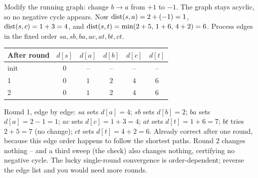 \begin{labbox}
Modify the running graph: change $b\to a$ from $+1$ to $-1$. The graph stays acyclic, so no
negative cycle appears. Now $\operatorname{dist}(s,a)=2+(-1)=1$, $\operatorname{dist}(s,c)=1+3=4$, and
$\operatorname{dist}(s,t)=\min(2+5,\,1+6,\,4+2)=6$. Process edges in the fixed order
$sa,sb,ba,ac,at,bt,ct$.

\medskip

\begin{center}
\end{center}

\begin{center}
\begin{tabular}{lccccc}
\toprule
After round & $d[s]$ & $d[a]$ & $d[b]$ & $d[c]$ & $d[t]$ \\
\midrule
init & $0$ & -- & -- & -- & -- \\
1 & $0$ & $1$ & $2$ & $4$ & $6$ \\
2 & $0$ & $1$ & $2$ & $4$ & $6$ \\
\bottomrule
\end{tabular}
\end{center}

\medskip
Round 1, edge by edge: $sa$ sets $d[a]=4$; $sb$ sets $d[b]=2$; $ba$ sets
$d[a]=2-1=1$; $ac$ sets $d[c]=1+3=4$; $at$ sets $d[t]=1+6=7$; $bt$ tries $2+5=7$
(no change); $ct$ sets $d[t]=4+2=6$. Already correct after one round, because this edge
order happens to follow the shortest paths. Round 2 changes nothing -- and a third sweep
(the check) also changes nothing, certifying no negative cycle. The lucky single-round
convergence is order-dependent; reverse the edge list and you would need more rounds.
\end{labbox}

